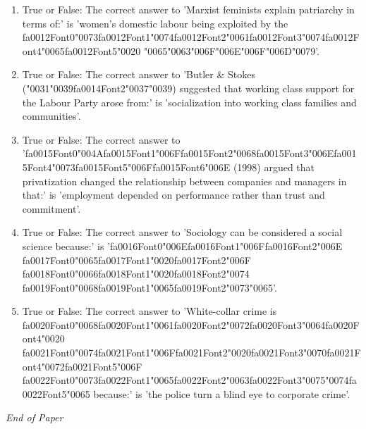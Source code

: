 \documentclass[12pt]{article}
\begin{document}
\begin{enumerate}[label=\arabic*.]
\item True or False: The correct answer to 'Marxist feminists explain patriarchy in terms of:' is 'women's domestic labour being exploited by the {\csname fa0012Font0\endcsname\char"0073}{\csname fa0012Font1\endcsname\char"0074}{\csname fa0012Font2\endcsname\char"0061}{\csname fa0012Font3\endcsname\char"0074}{\csname fa0012Font4\endcsname\char"0065}{\csname fa0012Font5\endcsname\char"0020} {\char"0065}{\char"0063}{\char"006F}{\char"006E}{\char"006F}{\char"006D}{\char"0079}'.
\item True or False: The correct answer to 'Butler \& Stokes ({\char"0031}{\char"0039}{\csname fa0014Font2\endcsname\char"0037}{\char"0039}) suggested that working class support for the Labour Party arose from:' is 'socialization into working class families and communities'.
\item True or False: The correct answer to '{\csname fa0015Font0\endcsname\char"004A}{\csname fa0015Font1\endcsname\char"006F}{\csname fa0015Font2\endcsname\char"0068}{\csname fa0015Font3\endcsname\char"006E}{\csname fa0015Font4\endcsname\char"0073}{\csname fa0015Font5\endcsname\char"006F}{\csname fa0015Font6\endcsname\char"006E} (1998) argued that privatization changed the relationship between companies and managers in that:' is 'employment depended on performance rather than trust and commitment'.
\item True or False: The correct answer to 'Sociology can be considered a social science because:' is '{\csname fa0016Font0\endcsname\char"006E}{\csname fa0016Font1\endcsname\char"006F}{\csname fa0016Font2\endcsname\char"006E} {\csname fa0017Font0\endcsname\char"0065}{\csname fa0017Font1\endcsname\char"0020}{\csname fa0017Font2\endcsname\char"006F} {\csname fa0018Font0\endcsname\char"0066}{\csname fa0018Font1\endcsname\char"0020}{\csname fa0018Font2\endcsname\char"0074} {\csname fa0019Font0\endcsname\char"0068}{\csname fa0019Font1\endcsname\char"0065}{\csname fa0019Font2\endcsname\char"0073}{\char"0065}'.
\item True or False: The correct answer to 'White-collar crime is {\csname fa0020Font0\endcsname\char"0068}{\csname fa0020Font1\endcsname\char"0061}{\csname fa0020Font2\endcsname\char"0072}{\csname fa0020Font3\endcsname\char"0064}{\csname fa0020Font4\endcsname\char"0020} {\csname fa0021Font0\endcsname\char"0074}{\csname fa0021Font1\endcsname\char"006F}{\csname fa0021Font2\endcsname\char"0020}{\csname fa0021Font3\endcsname\char"0070}{\csname fa0021Font4\endcsname\char"0072}{\csname fa0021Font5\endcsname\char"006F} {\csname fa0022Font0\endcsname\char"0073}{\csname fa0022Font1\endcsname\char"0065}{\csname fa0022Font2\endcsname\char"0063}{\csname fa0022Font3\endcsname\char"0075}{\char"0074}{\csname fa0022Font5\endcsname\char"0065} because:' is 'the police turn a blind eye to corporate crime'.
\end{enumerate}

\vfill
\noindent\textit{End of Paper}
\end{document}
